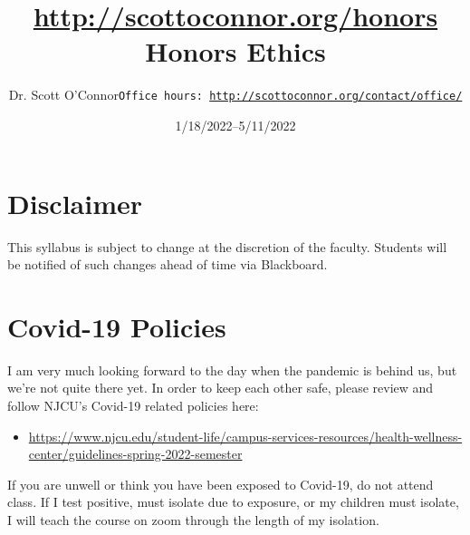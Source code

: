 \documentclass[article,oneside]{memoir}
\def\myauthor{Author}
\def\mytitle{Title}
\def\mycopyright{\myauthor}
\def\myweb{\href{http://scottoconnor.org/honors}{http://scottoconnor.org/honors}}
\def\myauthor{Dr. Scott O'Connor}
\def\mytitle{{\normalsize \myweb \newline} \HUGE Honors Ethics}
\begin{document}
\setsansfont[Mapping=tex-text]{Myriad Pro} 
\setmonofont[Mapping=tex-text,Scale=0.8]{Georgia} 

\def\ind{\hangindent=1 true cm\hangafter=1 \noindent}
\def\labelitemi{$\cdot$}


\title{\LARGE \mytitle}     
\author{\Large\myauthor \newline \footnotesize\texttt{\noindent Office hours: \href{http://scottoconnor.org/contact/office/}{http://scottoconnor.org/contact/office/}}}
\date{1/18/2022--5/11/2022}



\maketitle




%
%


\section{Disclaimer}
 This syllabus is subject to change at the discretion of the faculty. Students will be notified of such changes ahead of time via Blackboard. 

\section{Covid-19 Policies}
I am very much looking forward to the day when the pandemic is behind us, but we’re not quite there yet. In order to keep each other safe, please review and follow NJCU's Covid-19 related policies here:  
\begin{itemize}
\item \href{https://www.njcu.edu/student-life/campus-services-resources/health-wellness-center/guidelines-spring-2022-semester}{https://www.njcu.edu/student-life/campus-services-resources/health-wellness-center/guidelines-spring-2022-semester}
\end{itemize}
If you are unwell or think you have been exposed to Covid-19, do not attend class. If I test positive, must isolate due to exposure, or my children must isolate, I will teach the course on zoom through the length of my isolation. 
\end{document}
